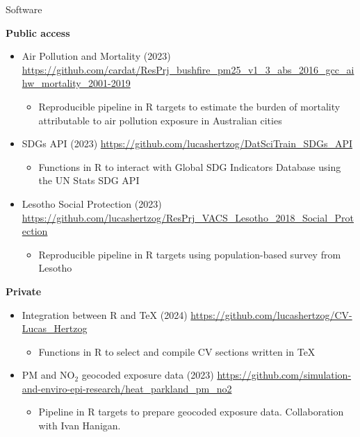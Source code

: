 \begin{rSection}{Software}

\large  {\textbf{Public access}}
\begin{itemize}

\item{Air Pollution and Mortality (2023) \url{https://github.com/cardat/ResPrj_bushfire_pm25_v1_3_abs_2016_gcc_aihw_mortality_2001-2019}}
\begin{itemize}
	\item{Reproducible pipeline in R targets to estimate the burden of mortality attributable to air pollution exposure in Australian cities}
\end{itemize}

\item{SDGs API (2023) \url{https://github.com/lucashertzog/DatSciTrain_SDGs_API}}
    \begin{itemize}
      \item{Functions in R to interact with Global SDG Indicators Database using the UN Stats SDG API}
      \end{itemize}

\item{Lesotho Social Protection (2023)} \url{https://github.com/lucashertzog/ResPrj_VACS_Lesotho_2018_Social_Protection}
    \begin{itemize}
    \item{Reproducible pipeline in R targets using population-based survey from Lesotho}
    \end{itemize}
    
 \end{itemize}
 
\vspace{1em}

\large  {\textbf{Private}}
\begin{itemize}
 
\item{Integration between R and TeX (2024)} \url{https://github.com/lucashertzog/CV-Lucas_Hertzog}
     \begin{itemize}
     \item{Functions in R to select and compile CV sections written in TeX}
     \end{itemize}
     
\item{PM and NO$_{2}$ geocoded exposure data (2023)} \url{https://github.com/simulation-and-enviro-epi-research/heat_parkland_pm_no2}
     \begin{itemize}
     	\item{Pipeline in R targets to prepare geocoded exposure data. Collaboration with Ivan Hanigan.}
     \end{itemize}
	 

\end{itemize}
\end{rSection}
